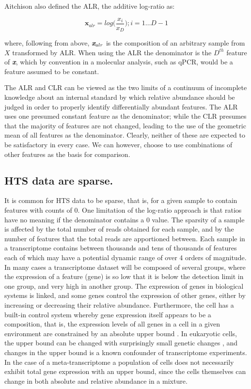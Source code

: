 \documentclass[graybox]{svmult}
\begin{document}
Aitchison \cite{Aitchison:1986} also defined the ALR, the additive log-ratio as: 

\begin{equation}
\textbf{x}_{alr} = log  \Big( \frac{x_{i}}{x_D}   \Big) ; i=1\dots D-1
\label{eq:ALR}
\end{equation}

where, following from above, $\textit{\textbf{x}}_{alr}$ is the composition of an arbitrary sample from $X$ transformed by ALR. When using the ALR  the denominator is the $D^{th}$ feature of \textit{\textbf{x}}, which by convention in a molecular analysis, such as qPCR, would be a feature assumed to be constant. 

The ALR and CLR can be viewed as the two limits of a continuum of incomplete knowledge about an internal standard by which relative abundance should be judged in order to properly identify differentially abundant features. The ALR uses one presumed constant feature as the denominator; while the CLR  presumes that the majority of features are not changed, leading to the use of the geometric mean of all features as the denominator. Clearly, neither of these are expected to be satisfactory in every case. We can however, choose to use combinations of other features as the basis for comparison.

\subsection*{HTS data are sparse.}
\label{subsec:1.2}
It is common for HTS data to be sparse, that is, for a given sample to contain features with counts of 0. One limitation of the log-ratio approach is that ratios have no meaning if the denominator contains a 0 value. The sparsity of a sample is affected by the total number of reads obtained for each sample, and by the number of features that the total reads are apportioned between. Each sample in a transcriptome contains between thousands and tens of thousands of features each of which may have a potential dynamic range of over 4 orders of magnitude. In many cases a transcriptome dataset will be composed of several groups, where the expression of a feature (gene) is so low that it is below the detection limit in one group, and very high in another group. The expression of genes in biological systems is linked, and some genes control the expression of other genes, either by increasing or decreasing their relative abundance. Furthermore, the cell has a built-in control system whereby gene expression itself appears to be a composition, that is, the expression levels of all genes in a cell in a given environment are constrained by an absolute upper bound  \cite{Scott:2010}. In eukaryotic cells, the upper bound can be changed with surprisingly small genetic changes \cite{Loven:2012aa}, and changes in the upper bound is a known confounder of transcriptome experiments. In the case of a meta-transcriptome a population of cells  does not necessarily exhibit total gene expression with an upper bound, since the cells themselves can change in both absolute and relative abundance in a mixture. 
\end{document}
